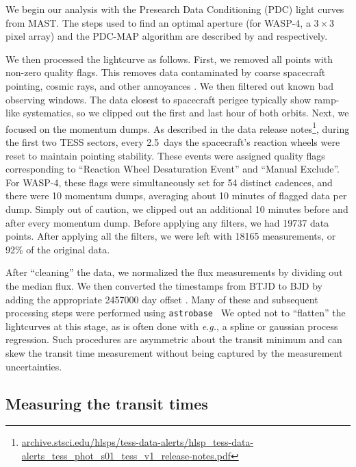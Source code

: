 \documentclass[12pt,twocolumn,tighten]{aastex62}
\begin{document}
We begin our analysis with the Presearch Data Conditioning (PDC) light
curves from MAST.  The steps used to find an optimal aperture (for
WASP-4, a $3\times 3$ pixel array) and the PDC-MAP algorithm are
described by \citet{smith_kepler_apertures_2017} and
\citet{smith_kepler_PDC_2017} respectively.

We then processed the lightcurve as follows.  First, we removed all points
with non-zero quality flags.  This removes data contaminated by
coarse spacecraft pointing, cosmic rays, and other annoyances
\citep{tess_data_product_description_2018}.  We then filtered out known
bad observing windows.  The data closest to spacecraft perigee typically
show ramp-like systematics, so we clipped out the first and last hour of
both orbits.  Next, we focused on the momentum dumps. As described in
the data release
notes\footnote{\url{archive.stsci.edu/hlsps/tess-data-alerts/hlsp_tess-data-alerts_tess_phot_s01_tess_v1_release-notes.pdf}},
during the first two TESS sectors, every 2.5~days the spacecraft's
reaction wheels were reset to maintain pointing stability.  These events
were assigned quality flags corresponding to ``Reaction Wheel
Desaturation Event'' and ``Manual Exclude''.  For WASP-4,
these flags were simultaneously set for 54 distinct cadences, and there
were 10 momentum dumps, averaging about 10 minutes of flagged data per
dump.  Simply out of caution, we clipped out an additional 10 minutes
before and after every momentum dump.  Before applying any filters, we
had 19737 data points. After applying all the filters, we were left with
18165 measurements, or 92\% of the original data.

After ``cleaning'' the data, we normalized the flux measurements by
dividing out the median flux.  We then converted the timestamps from
BTJD to BJD by adding the appropriate 2457000 day offset
\citep{tess_data_product_description_2018}.  Many of these and
subsequent processing steps were performed using
\texttt{astrobase}~\citep{bhatti_astrobase_2018} We opted not to
``flatten'' the lightcurves at this stage, as is often done with {\it
e.g.}, a spline or gaussian process regression.  Such procedures are
asymmetric about the transit minimum and can skew the transit time
measurement without being captured by the measurement uncertainties.



\subsection{Measuring the transit times}
\end{document}
